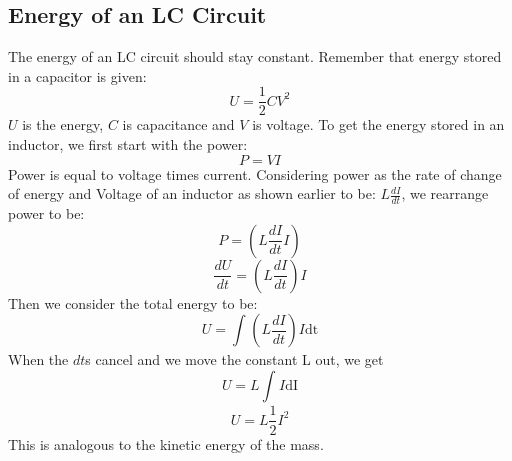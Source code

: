 \documentclass[10pt]{report}
\begin{document}
{\subsection{Energy of an LC Circuit}
\par{The energy of an LC circuit should stay constant. Remember that energy stored in a capacitor is given: \[
U=\frac{1}{2}CV^{2}
\] $U$ is the energy, $C$ is capacitance and $V$ is voltage. To get the energy stored in an inductor, we first start with the power: \[
P=VI
\] Power is equal to voltage times current. Considering power as the rate of change of energy and Voltage of an inductor as shown earlier to be: $L\frac{dI}{dt}$, we rearrange power to be: \[
P=\left(L\frac{dI}{dt}I\right)
\] \[
\frac{dU}{dt}=\left(L\frac{dI}{dt}\right)I
\] Then we consider the total energy to be: \[
U=\int_{}^{}{\left(L\frac{dI}{dt}\right)I}\mathrm{dt}
\] When the $dt$s cancel and we move the constant L out, we get  \[
U=L\int_{}^{}{I}\mathrm{dI}
\] \[
U=L\frac{1}{2}I^{2}
\] This is analogous to the kinetic energy of the mass. }
}
\end{document}
